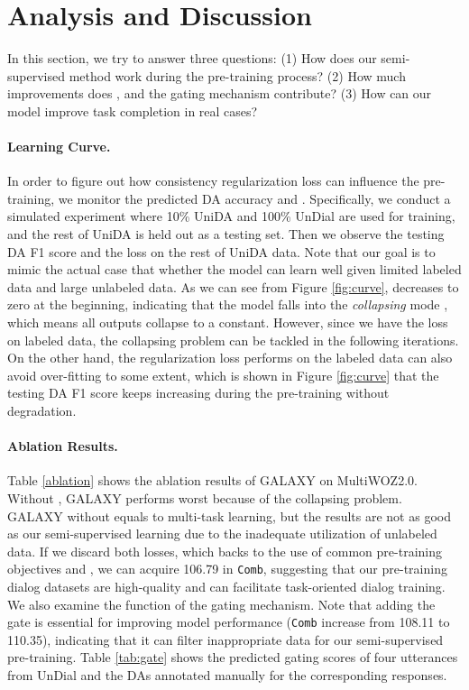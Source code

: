 \documentclass[letterpaper]{article} \usepackage{aaai22}  \usepackage{times}  \usepackage{helvet}  \usepackage{courier}  \usepackage[hyphens]{url}  \usepackage{graphicx} \urlstyle{rm} \def\UrlFont{\rm}  \usepackage{natbib}  \usepackage{caption} \DeclareCaptionStyle{ruled}{labelfont=normalfont,labelsep=colon,strut=off} \frenchspacing  \setlength{\pdfpagewidth}{8.5in}  \setlength{\pdfpageheight}{11in}  \usepackage{algorithm}
\begin{document}
\section{Analysis and Discussion}
In this section, we try to answer three questions: (1) How does our semi-supervised method work during the pre-training process? (2) How much improvements does ,     and the gating mechanism contribute? 
(3) How can our model improve task completion in real cases?

\paragraph{Learning Curve.} In order to figure out how consistency regularization loss can influence the pre-training, we monitor the predicted DA accuracy and . Specifically, we conduct a simulated experiment where 10\% UniDA and 100\% UnDial are used for training, and the rest of UniDA is held out as a testing set. Then we observe the testing DA F1 score and the  loss on the rest of UniDA data. Note that our goal is to mimic the actual case that whether the model can learn well given limited labeled data and large unlabeled data.
As we can see from Figure \ref{fig:curve},   decreases to zero at the beginning, indicating that the model falls into the \textit{collapsing} mode \cite{chen2021exploring}, which means all outputs collapse to a constant. 
However, since we have the  loss on labeled data, the collapsing problem can be tackled in the following iterations. 
On the other hand, the regularization loss  performs on the labeled data can also avoid over-fitting to some extent, which is shown in Figure \ref{fig:curve} that the testing DA F1 score keeps increasing during the pre-training without degradation.



\paragraph{Ablation Results.} 
Table \ref{ablation} shows the ablation results of GALAXY on MultiWOZ2.0. Without , GALAXY performs worst because of the collapsing problem. GALAXY without  equals to multi-task learning, but the results are not as good as our semi-supervised learning due to the inadequate utilization of unlabeled data. If we discard both losses, which backs to the use of common pre-training objectives  and , we can acquire 106.79 in \texttt{Comb}, suggesting that our pre-training dialog datasets are high-quality and can facilitate task-oriented dialog training. We also examine the function of the gating mechanism.  Note that adding the gate  is essential for improving model performance (\texttt{Comb} increase from 108.11 to 110.35), indicating that it can filter inappropriate data for our semi-supervised pre-training. 
Table \ref{tab:gate} shows the predicted gating scores of four utterances from UnDial and the DAs annotated manually for the corresponding responses.
\end{document}
